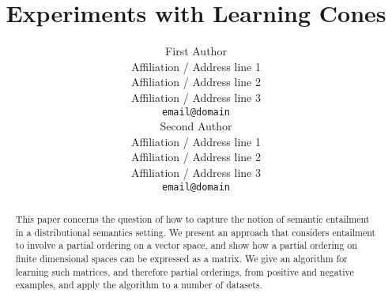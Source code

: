 \documentclass[11pt]{article}
\title{Experiments with Learning Cones}
\author{First Author \\
  Affiliation / Address line 1 \\
  Affiliation / Address line 2 \\
  Affiliation / Address line 3 \\
  {\tt email@domain} \\\And
  Second Author \\
  Affiliation / Address line 1 \\
  Affiliation / Address line 2 \\
  Affiliation / Address line 3 \\
  {\tt email@domain} \\}
\date{}
\begin{document}
\maketitle

\begin{abstract}
  This paper concerns the question of how to capture the notion of
  semantic entailment in a distributional semantics setting. We
  present an approach that considers entailment to involve a partial
  ordering on a vector space, and show how a partial ordering on
  finite dimensional spaces can be expressed as a matrix. We give an
  algorithm for learning such matrices, and therefore partial
  orderings, from positive and negative examples, and apply the
  algorithm to a number of datasets.
\end{abstract}














\newpage



\end{document}
